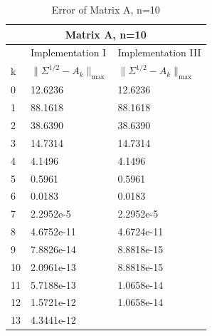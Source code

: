 \begin{table}
\begin{center}
\label{Table: A10}
\begin{tabular}{| l | l | l | }

	\hline
	\multicolumn{3}{|c|}{Matrix A, n=10}  \\
	\hline
	   & Implementation I & Implementation III \\
	k & $\parallel \Sigma^{1/2} - A_{k}\parallel_{\text{max}}$ & $\parallel \Sigma^{1/2} - A_{k}\parallel_{\text{max}}$  \\	
	\hline
	0 &  12.6236& 12.6236 \\
	1 & 88.1618& 88.1618  \\
	2 & 38.6390& 38.6390   \\
	3 & 14.7314& 14.7314 \\
	4 & 4.1496& 4.1496 \\
	5 & 0.5961& 0.5961  \\
	6 & 0.0183& 0.0183  \\
	7 & 2.2952e-5& 2.2952e-5 \\
	8 & 4.6752e-11& 4.6724e-11 \\
	9 & 7.8826e-14& 8.8818e-15  \\
	10& 2.0961e-13& 8.8818e-15\\ 
	11& 5.7188e-13&1.0658e-14\\
	12&1.5721e-12& 1.0658e-14 \\
	13&4.3441e-12 & \\

	\hline
	
\end{tabular}
\caption{Error of Matrix A, n=10}
\end{center}
\end{table}

